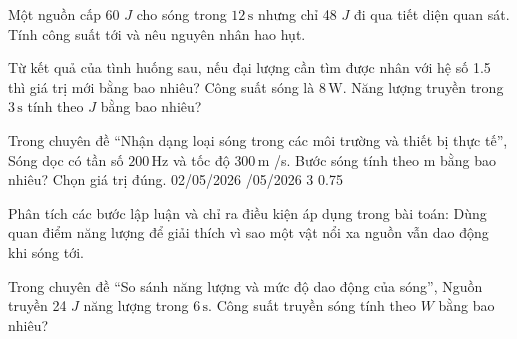 \begin{bt}
Một nguồn cấp 60 $J$ cho sóng trong $12\,\text{s}$ nhưng chỉ 48 $J$ đi qua tiết diện quan sát. Tính công suất tới và nêu nguyên nhân hao hụt.
\end{bt}

\begin{ex}
Từ kết quả của tình huống sau, nếu đại lượng cần tìm được nhân với hệ số 1.5 thì giá trị mới bằng bao nhiêu? Công suất sóng là $8\,\text{W}$. Năng lượng truyền trong $3\,\text{s}$ tính theo $J$ bằng bao nhiêu?
\end{ex}

\begin{ex}
Trong chuyên đề “Nhận dạng loại sóng trong các môi trường và thiết bị thực tế”, Sóng dọc có tần số $200\,\text{Hz}$ và tốc độ $300\,\text{m}$ /s. Bước sóng tính theo m bằng bao nhiêu? Chọn giá trị đúng.
\choice
{02/05/2026}
{/05/2026}
{3}
{0.75}
\end{ex}

\begin{ex}
Phân tích các bước lập luận và chỉ ra điều kiện áp dụng trong bài toán: Dùng quan điểm năng lượng để giải thích vì sao một vật nổi xa nguồn vẫn dao động khi sóng tới.
\choiceTF

\end{ex}

\begin{ex}
Trong chuyên đề “So sánh năng lượng và mức độ dao động của sóng”, Nguồn truyền 24 $J$ năng lượng trong $6\,\text{s}$. Công suất truyền sóng tính theo $W$ bằng bao nhiêu?
\end{ex}

